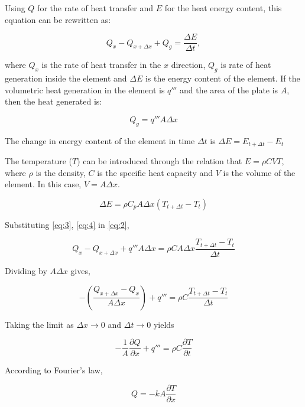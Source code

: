 Using $Q$ for the rate of heat transfer and $E$ for the heat energy content,
this equation can be rewritten as:

\begin{equation}
Q_x- Q_{x+\Delta x} +Q_g=\frac{\Delta E}{\Delta t}, \label{eq:2}
\end{equation}

where $Q_x$ is the rate of heat transfer in the $x$ direction, $Q_g$ is rate of
heat generation inside the element and $\Delta E$ is the energy content of the
element.  If the volumetric heat generation in the element is $q'''$ and the
area of the plate is $A$, then the heat generated is:

\begin{equation}
Q_g=q'''A \Delta x \label{eq:3}
\end{equation}

The change in energy content of the element in time $\Delta t$ is
$\Delta E=E_{t+\Delta t}-E_t$

The temperature ($T$) can be introduced through the relation that $E=\rho C VT$,
where $\rho$ is the density, $C$ is the specific heat capacity and $V$ is the
volume of the element. In this case, $V=A\Delta x$.

\begin{equation}
 \Delta E=\rho C_p A\Delta x(T_{t+\Delta t}-T_t) \label{eq:4}
\end {equation}

Substituting \ref{eq:3}, \ref{eq:4} in \ref{eq:2}, 

\begin{equation}
Q_x -Q_{x+\Delta x} +q'''A\Delta x=\rho C A\Delta x\frac{T_{t+\Delta t}-T_t}{\Delta t} \label{eq:5}
\end{equation}

Dividing by $A\Delta x$ gives,

\begin{equation}
-(\frac{ Q_{x+\Delta x}-Q_x}{A \Delta x}) +q'''=\rho C \frac{T_{t+\Delta t}-T_t}{\Delta t} \label{eq:6}
\end{equation}

Taking the limit as $\Delta x \to 0$ and $\Delta t \to 0$ yields

\begin{equation}
-\frac{1}{A}\frac{\partial Q}{\partial x}+q'''=\rho C \frac{\partial T}{\partial t} \label{eq:7}
\end{equation}

According to Fourier's law, 

\begin{equation}
Q=-kA\frac{\partial T}{\partial x} \label{eq:8}
\end{equation}

